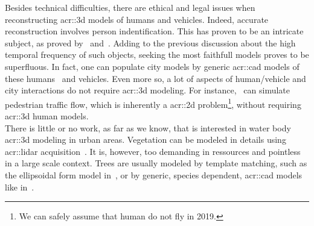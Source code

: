            Besides technical difficulties, there are ethical and legal issues when reconstructing \gls{acr::3d} models of humans and vehicles.
            Indeed, accurate reconstruction involves person indentification.
            This has proven to be an intricate subject, as proved by~\textcite{tavani2011ethics} and~\textcite{thornton2010individual}.
            Adding to the previous discussion about the high temporal frequency of such objects, seeking the most faithfull models proves to be superfluous.
            In fact, one can populate city models by generic \gls{acr::cad} models of these humans~\parencite{shao2007autonomous} and vehicles.
            Even more so, a lot of aspects of human/vehicle and city interactions do not require \gls{acr::3d} modeling.
            For instance,~\textcite{lovaas1994modeling} can simulate pedestrian traffic flow, which is inherently a \gls{acr::2d} problem\footnote{
                We can safely assume that human do not fly in 2019.
            }, without requiring \gls{acr::3d} human models.\\
            There is little or no work, as far as we know, that is interested in water body \gls{acr::3d} modeling in urban areas.
            Vegetation can be modeled in details using \gls{acr::lidar} acquisition~\parencite{omasa20063d}.
            It is, however, too demanding in ressources and pointless in a large scale context.
            Trees are usually modeled by template matching, such as the ellipsoidal form model in~\textcite{lafarge_ijcv12}, or by generic, species dependent, \gls{acr::cad} models like in~\textcite{iovan2008detection}.\\

